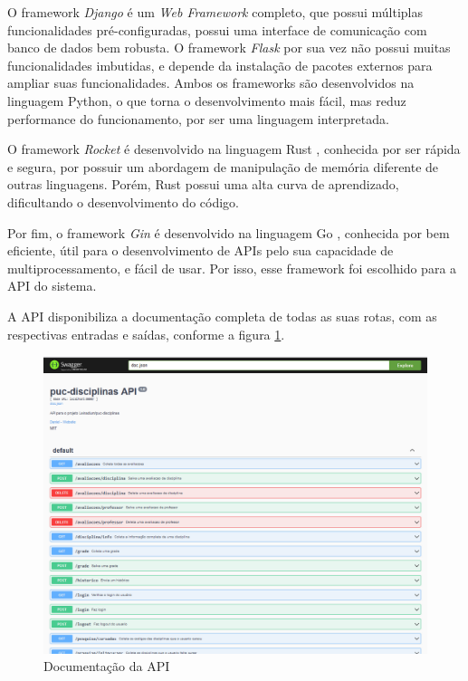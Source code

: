 O framework \textit{Django} é um \textit{Web Framework} completo, que possui múltiplas funcionalidades pré-configuradas, possui uma interface de comunicação com banco de dados bem robusta. O framework \textit{Flask} por sua vez não possui muitas funcionalidades imbutidas, e depende da instalação de pacotes externos para ampliar suas funcionalidades. Ambos os frameworks são desenvolvidos na linguagem Python, o que torna o desenvolvimento mais fácil, mas reduz performance do funcionamento, por ser uma linguagem interpretada.

O framework \textit{Rocket} é desenvolvido na linguagem Rust \cite{site-rust}, conhecida por ser rápida e segura, por possuir um abordagem de manipulação de memória diferente de outras linguagens. Porém, Rust possui uma alta curva de aprendizado, dificultando o desenvolvimento do código.

Por fim, o framework \textit{Gin} é desenvolvido na linguagem Go \cite{site-go}, conhecida por bem eficiente, útil para o desenvolvimento de APIs pelo sua capacidade de multiprocessamento, e fácil de usar. Por isso, esse framework foi escolhido para a API do sistema.

A API disponibiliza a documentação completa de todas as suas rotas, com as respectivas entradas e saídas, conforme a figura \ref{fig:api}.

\begin{figure}[ht]
    \begin{center}
    \includegraphics[width=360pt]{figuras/api.png}
    \caption{Documentação da API}
    \label{fig:api}
    \end{center}
\end{figure}

